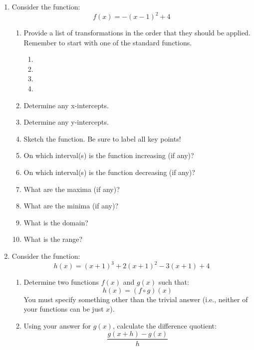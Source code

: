 \documentclass[letterpaper,12pt,fleqn]{article}
\begin{document}
\begin{enumerate}
\newpage

\item Consider the function:
\[f(x)=-(x-1)^2+4\]
\begin{enumerate}
\item Provide a list of transformations in the order that they should be
  applied. Remember to start with one of the standard functions.
\begin{enumerate}
\item
\item
\item
\item
\end{enumerate}

\item Determine any x-intercepts.

\vspace{2in}

\item Determine any y-intercepts.

\vspace{1in}

\item Sketch the function. Be sure to label all key points!
\newpage
\item On which interval(s) is the function increasing (if any)?

\vspace{1in}

\item On which interval(s) is the function decreasing (if any)?

\vspace{1in}

\item What are the maxima (if any)?

\vspace{1in}

\item What are the minima (if any)?

\vspace{1in}

\item What is the domain?

\vspace{1in}

\item What is the range?
\end{enumerate}
\newpage
\item Consider the function:
  \[h(x)=(x+1)^3+2(x+1)^2-3(x+1)+4\]
  \begin{enumerate}
    \item Determine two functions $f(x)$ and $g(x)$ such that:
      \[h(x)=(f\circ g)(x)\]
      You must specify something other than the trivial answer (i.e., neither of
      your functions can be just $x$).

      \vspace{2in}

    \item Using your answer for $g(x)$, calculate the difference quotient:
      \[\frac{g(x+h)-g(x)}{h}\]
  \end{enumerate}
\end{enumerate}
\end{document}
